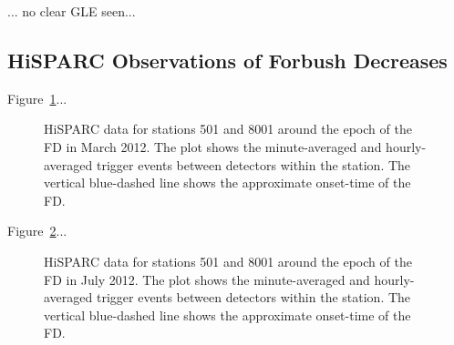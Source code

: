 ... no clear GLE seen...

\subsection{HiSPARC Observations of Forbush Decreases}

Figure~\ref{fig:FD_201203}...

\begin{figure}[ht]
	\centering
	
	\caption{HiSPARC data for stations 501 and 8001 around the epoch of the FD in March 2012. The plot shows the minute-averaged and hourly-averaged trigger events between detectors within the station. The vertical blue-dashed line shows the approximate onset-time of the FD.}
	\label{fig:FD_201203}
\end{figure}


Figure~\ref{fig:FD_201207}...

\begin{figure}[ht]
	\centering
	
	\caption{HiSPARC data for stations 501 and 8001 around the epoch of the FD in July 2012. The plot shows the minute-averaged and hourly-averaged trigger events between detectors within the station. The vertical blue-dashed line shows the approximate onset-time of the FD.}
	\label{fig:FD_201207}
\end{figure}



